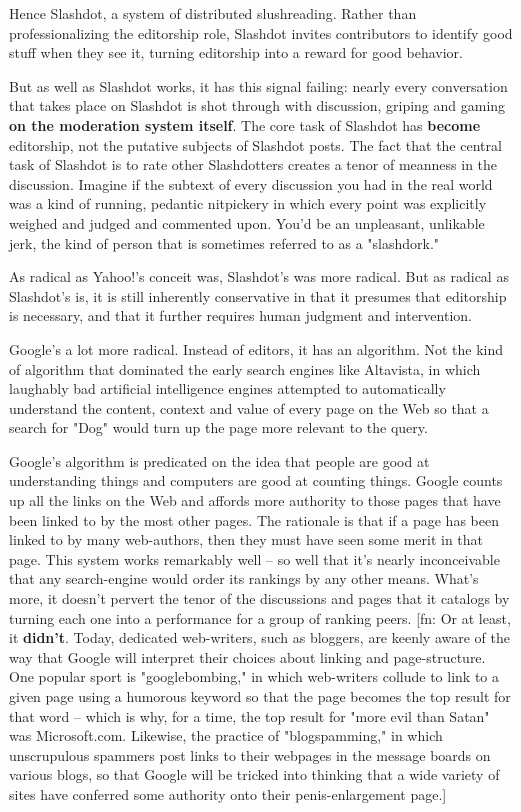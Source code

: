 Hence Slashdot, a system of distributed slushreading. Rather than
professionalizing the editorship role, Slashdot invites
contributors to identify good stuff when they see it, turning
editorship into a reward for good behavior.

But as well as Slashdot works, it has this signal failing: nearly
every conversation that takes place on Slashdot is shot through
with discussion, griping and gaming
\textbf{on the moderation system itself}. The core task of Slashdot
has \textbf{become} editorship, not the putative subjects of
Slashdot posts. The fact that the central task of Slashdot is to
rate other Slashdotters creates a tenor of meanness in the
discussion. Imagine if the subtext of every discussion you had in
the real world was a kind of running, pedantic nitpickery in which
every point was explicitly weighed and judged and commented upon.
You'd be an unpleasant, unlikable jerk, the kind of person that is
sometimes referred to as a "slashdork."

As radical as Yahoo!'s conceit was, Slashdot's was more radical.
But as radical as Slashdot's is, it is still inherently
conservative in that it presumes that editorship is necessary, and
that it further requires human judgment and intervention.

Google's a lot more radical. Instead of editors, it has an
algorithm. Not the kind of algorithm that dominated the early
search engines like Altavista, in which laughably bad artificial
intelligence engines attempted to automatically understand the
content, context and value of every page on the Web so that a
search for "Dog" would turn up the page more relevant to the
query.

Google's algorithm is predicated on the idea that people are good
at understanding things and computers are good at counting things.
Google counts up all the links on the Web and affords more
authority to those pages that have been linked to by the most other
pages. The rationale is that if a page has been linked to by many
web-authors, then they must have seen some merit in that page. This
system works remarkably well -- so well that it's nearly
inconceivable that any search-engine would order its rankings by
any other means. What's more, it doesn't pervert the tenor of the
discussions and pages that it catalogs by turning each one into a
performance for a group of ranking peers. [fn: Or at least, it
\textbf{didn't}. Today, dedicated web-writers, such as bloggers,
are keenly aware of the way that Google will interpret their
choices about linking and page-structure. One popular sport is
"googlebombing," in which web-writers collude to link to a given
page using a humorous keyword so that the page becomes the top
result for that word -- which is why, for a time, the top result
for "more evil than Satan" was Microsoft.com. Likewise, the
practice of "blogspamming," in which unscrupulous spammers post
links to their webpages in the message boards on various blogs, so
that Google will be tricked into thinking that a wide variety of
sites have conferred some authority onto their penis-enlargement
page.]

